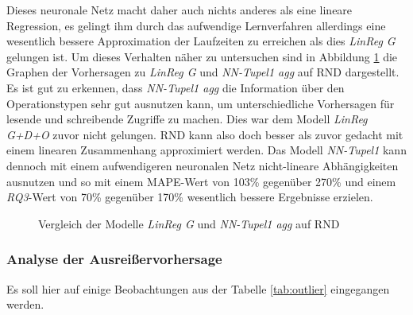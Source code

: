 \documentclass[
	12pt,
	a4paper,
	BCOR10mm,
	DIV14,
	listof=totoc,
	bibliography=totoc,
	headsepline
]{scrreprt}
\begin{document}
Dieses neuronale Netz macht daher auch nichts anderes als eine lineare Regression, es gelingt ihm durch das aufwendige Lernverfahren allerdings eine wesentlich bessere Approximation der Laufzeiten zu erreichen als dies \textit{LinReg G} gelungen ist.
Um dieses Verhalten näher zu untersuchen sind in Abbildung \ref{fig:lin_vergleich} die Graphen der Vorhersagen zu \textit{LinReg G} und \textit{NN-Tupel1 agg} auf RND dargestellt.
Es ist gut zu erkennen, dass \textit{NN-Tupel1 agg} die Information über den Operationstypen sehr gut ausnutzen kann, um unterschiedliche Vorhersagen für lesende und schreibende Zugriffe zu machen.
Dies war dem Modell \textit{LinReg G+D+O} zuvor nicht gelungen.
RND kann also doch besser als zuvor gedacht mit einem linearen Zusammenhang approximiert werden.
Das Modell \textit{NN-Tupel1} kann dennoch mit einem aufwendigeren neuronalen Netz nicht-lineare Abhängigkeiten ausnutzen und so mit einem MAPE-Wert von 103\% gegenüber 270\% und einem \textit{RQ3}-Wert von 70\% gegenüber 170\% wesentlich bessere Ergebnisse erzielen.
\begin{figure}
	\centering
	\hfill
	\caption{Vergleich der Modelle \textit{LinReg G} und \textit{NN-Tupel1 agg} auf RND}
	\label{fig:lin_vergleich}
\end{figure} 

\subsubsection{Analyse der Ausreißervorhersage}
Es soll hier auf einige Beobachtungen aus der Tabelle \ref{tab:outlier} eingegangen werden.
\end{document}
